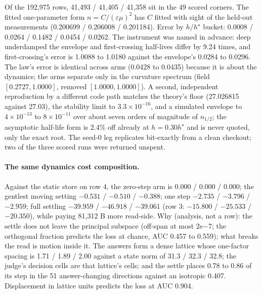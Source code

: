 \documentclass{article} %
\newcommand{\sci}[2]{\ensuremath{#1\times10^{#2}}}
\begin{document}
\noindent Of the 192,975 rows, 41,493 / 41,405 / 41,358 sit in the 49 scored corners. The fitted
one-parameter form $n=C/(\varepsilon\mu)^2$ has $C$ fitted with sight of the held-out measurements
(0.200699 / 0.206008 / 0.201184). %
Error by $h/h^\star$ bucket: 0.0008 / 0.0264 / 0.1482 / 0.0454 / 0.0262. The instrument was named in
advance: deep underdamped the envelope and first-crossing half-lives differ by 9.24 times, and
first-crossing's error is 1.0088 to 1.0180 against the envelope's 0.0284 to 0.0296.
The law's error is identical across arms (0.0428 to 0.0435) because it is about the dynamics; the
arms separate only in the curvature spectrum (field $[0.2727, 1.0000]$, removed $[1.0000, 1.0000]$).
A second, independent reproduction by a different code path matches the theory's floor
(27.026815 against 27.03), the stability limit to \sci{3.3}{-16}, and a simulated envelope to
\sci{4}{-13} to \sci{8}{-11} over about seven orders of magnitude of $n_{1/2}$; the asymptotic
half-life form is 2.4\% off already at $h=0.30h^\star$ and is never quoted, only the exact root.
The seed-0 leg replicates bit-exactly from a clean checkout; two of the three scored runs were
returned unspent. %

\paragraph{The same dynamics cost composition.} Against the static store on row 4, the zero-step
arm is $0.000$ / $0.000$ / $0.000$; the gentlest moving setting $-0.531$ / $-0.510$ / $-0.388$; one
step $-2.735$ / $-3.796$ / $-2.959$; full settling $-39.959$ / $-46.918$ / $-39.061$ (row 3:
$-15.800$ / $-25.533$ / $-20.350$), while paying 81,312 B more read-side.
Why (analysis, not a row): the settle does not leave the principal subspace (off-span at most
2e$-$7; the orthogonal fraction predicts the loss at chance, AUC 0.457 to 0.559); what breaks the
read is motion inside it. The answers form a dense lattice whose one-factor spacing is 1.71 / 1.89 /
2.00 against a state norm of 31.3 / 32.3 / 32.8; the judge's decision cells are that lattice's
cells; and the settle places 0.78 to 0.86 of its step in the 51 answer-changing directions against
an isotropic 0.407. Displacement in lattice units predicts the loss at AUC 0.904.
\end{document}
